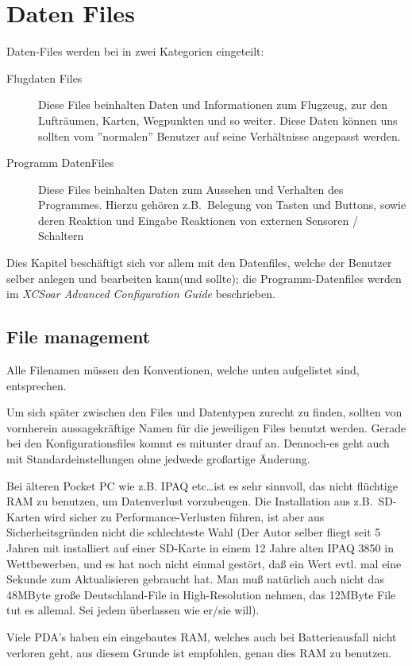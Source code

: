 \chapter{Daten  Files}\label{cha:data-files}
Daten-Files werden bei \xc in zwei Kategorien eingeteilt:
\begin{description}
\item[Flugdaten Files ] Diese Files beinhalten Daten und Informationen zum Flugzeug, zur den
    Lufträumen, Karten, Wegpunkten und so weiter.  Diese Daten können uns sollten vom ''normalen''
    Benutzer auf seine Verhältnisse angepasst werden.
\item[Programm DatenFiles] Diese Files beinhalten Daten zum Aussehen und Verhalten des
    Programmes. Hierzu gehören z.B.\ Belegung von Tasten und Buttons, sowie deren Reaktion und
    Eingabe Reaktionen von externen Sensoren / Schaltern
\end{description}
Dies Kapitel beschäftigt sich vor allem mit den Datenfiles, welche der Benutzer selber anlegen und
bearbeiten kann(und sollte);  die Programm-Datenfiles werden im {\em XCSoar Advanced Configuration
Guide} beschrieben.
\section{File management}
Alle Filenamen müssen den Konventionen, welche unten aufgelistet sind, entsprechen.

Um sich später zwischen den Files und Datentypen zurecht zu finden, sollten von vornherein
aussagekräftige Namen für die jeweiligen Files benutzt werden. Gerade bei den Konfigurationsfiles
kommt es mitunter drauf an. Dennoch-es geht auch mit Standardeinstellungen ohne jedwede großartige
Änderung.

Bei älteren Pocket PC wie z.B. IPAQ etc\dots ist es sehr sinnvoll, das nicht flüchtige RAM zu benutzen, um
Datenverlust vorzubeugen. Die Installation aus z.B.\ SD-Karten wird sicher zu Performance-Verlusten
führen, ist aber aus Sicherheitsgründen nicht die schlechteste Wahl (Der Autor selber fliegt seit 5 Jahren
mit \xc installiert auf einer SD-Karte in einem 12 Jahre alten IPAQ 3850 in Wettbewerben, und es hat noch
nicht einmal gestört, daß ein Wert evtl. mal eine Sekunde zum Aktualisieren gebraucht hat. Man muß
natürlich auch nicht das 48MByte große Deutschland-File in High-Resolution  nehmen, das 12MByte File tut es
allemal. Sei jedem überlassen wie er/sie will).

Viele PDA's haben ein eingebautes RAM, welches auch bei Batterieausfall nicht verloren geht, aus diesem
Grunde ist empfohlen, genau dies RAM zu benutzen.


